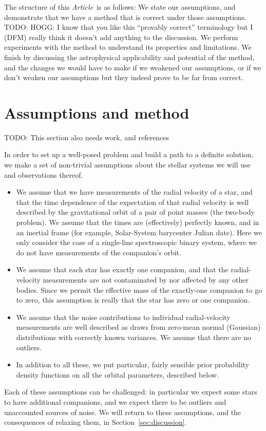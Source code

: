\documentclass[manuscript, letterpaper]{aastex6}
\newcommand{\documentname}{\textsl{Article}}
\newcommand{\sectionname}{Section}
\newcommand{\todo}[1]{{\color{red}TODO: #1}}
\begin{document}
The structure of this \documentname\ is as follows:
We state our assumptions, and demonstrate that we have a
method that is correct under those assumptions.
\todo{HOGG: I know that you like this ``provably correct'' terminology but I
(DFM) really think it doesn't add anything to the discussion.}
We perform experiments with the method to understand its properties and
limitations.
We finish by discussing the astrophysical applicability and potential of the
method, and the changes we would have to make if we weakened our assumptions, or
if we don't weaken our assumptions but they indeed prove to be far from correct.

\section{Assumptions and method} \label{sec:method}

\todo{This section also needs work, and references}

In order to set up a well-posed problem and build a path to a
definite solution, we make a set of non-trivial assumptions about the
stellar systems we will use and observations thereof.
\begin{itemize}\itemsep0ex  %
\item We assume that we have measurements of the radial velocity of a
  star, and that the time dependence of the expectation of that radial
  velocity is well described by the gravitational orbit of a pair of
  point masses (the two-body problem). We assume that the times are
  (effectively) perfectly known, and in an inertial frame (for
  example, Solar-System barycenter Julian date).
  Here we only consider the case of a single-line spectroscopic binary system,
  where we do not have measurements of the companion's orbit.
\item We assume that each star has exactly one companion, and that the
  radial-velocity measurements are not contaminated by nor affected by
  any other bodies. Since we permit the effective mass of the
  exactly-one companion to go to zero, this assumption is really that
  the star has zero or one companion.
\item We assume that the noise contributions to individual
  radial-velocity measurements are well described as draws from
  zero-mean normal (Gaussian) distributions with correctly known
  variances. We assume that there are no outliers.
\item In addition to all these, we put particular, fairly sensible
  prior probability density functions on all the orbital parameters,
  described below.
\end{itemize}
Each of these assumptions can be challenged: in particular we expect some stars
to have additional companions, and we expect there to be outliers and
unaccounted sources of noise.
We will return to these assumptions, and the consequences of relaxing them, in
\sectionname~\ref{sec:discussion}.
\end{document}
